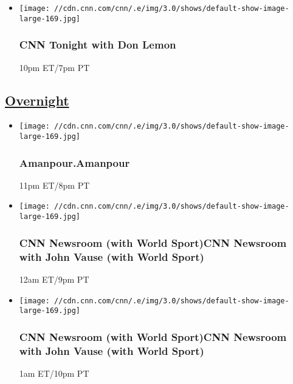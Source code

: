 \begin{itemize}
\item
  \texttt{[image: //cdn.cnn.com/cnn/.e/img/3.0/shows/default-show-image-large-169.jpg]}

  \hypertarget{cnn-tonight-with-don-lemon}{%
  \subsubsection{CNN Tonight with Don
  Lemon}\label{cnn-tonight-with-don-lemon}}

  10pm ET/7pm PT
\end{itemize}

\hypertarget{overnight--2}{%
\subsection{\texorpdfstring{\href{/tv/schedule/cnn/index.html}{Overnight}~}{Overnight~}}\label{overnight--2}}

\begin{itemize}
\item
  \texttt{[image: //cdn.cnn.com/cnn/.e/img/3.0/shows/default-show-image-large-169.jpg]}

  \hypertarget{amanpouramanpour--1}{%
  \subsubsection{Amanpour.Amanpour }\label{amanpouramanpour--1}}

  11pm ET/8pm PT
\end{itemize}

\begin{itemize}
\item
  \texttt{[image: //cdn.cnn.com/cnn/.e/img/3.0/shows/default-show-image-large-169.jpg]}

  \hypertarget{cnn-newsroom-with-world-sportcnn-newsroom-with-john-vause-with-world-sport-}{%
  \subsubsection{CNN Newsroom (with World Sport)CNN Newsroom with John
  Vause (with World Sport)
  }\label{cnn-newsroom-with-world-sportcnn-newsroom-with-john-vause-with-world-sport-}}

  12am ET/9pm PT
\end{itemize}

\begin{itemize}
\item
  \texttt{[image: //cdn.cnn.com/cnn/.e/img/3.0/shows/default-show-image-large-169.jpg]}

  \hypertarget{cnn-newsroom-with-world-sportcnn-newsroom-with-john-vause-with-world-sport--1}{%
  \subsubsection{CNN Newsroom (with World Sport)CNN Newsroom with John
  Vause (with World Sport)
  }\label{cnn-newsroom-with-world-sportcnn-newsroom-with-john-vause-with-world-sport--1}}

  1am ET/10pm PT
\end{itemize}

